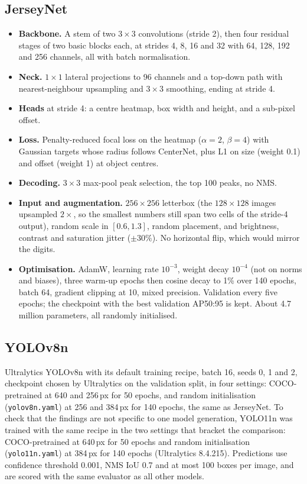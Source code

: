 \documentclass[10pt,a4paper]{article}
\begin{document}
\subsection{JerseyNet}
\begin{itemize}
  \item \textbf{Backbone.} A stem of two $3\times3$ convolutions (stride 2), then four residual
    stages of two basic blocks each, at strides 4, 8, 16 and 32 with 64, 128, 192 and 256
    channels, all with batch normalisation.
  \item \textbf{Neck.} $1\times1$ lateral projections to 96 channels and a top-down path with
    nearest-neighbour upsampling and $3\times3$ smoothing, ending at stride 4.
  \item \textbf{Heads} at stride 4: a centre heatmap, box width and height, and a sub-pixel offset.
  \item \textbf{Loss.} Penalty-reduced focal loss on the heatmap ($\alpha=2$, $\beta=4$) with
    Gaussian targets whose radius follows CenterNet, plus L1 on size (weight 0.1) and offset
    (weight 1) at object centres.
  \item \textbf{Decoding.} $3\times3$ max-pool peak selection, the top 100 peaks, no NMS.
  \item \textbf{Input and augmentation.} $256\times256$ letterbox (the $128\times128$ images
    upsampled $2\times$, so the smallest numbers still span two cells of the stride-4 output),
    random scale in $[0.6, 1.3]$, random placement, and brightness, contrast and saturation
    jitter ($\pm30\%$). No horizontal flip, which would mirror the digits.
  \item \textbf{Optimisation.} AdamW, learning rate $10^{-3}$, weight decay $10^{-4}$ (not on
    norms and biases), three warm-up epochs then cosine decay to 1\% over 140 epochs, batch 64,
    gradient clipping at 10, mixed precision. Validation every five epochs; the checkpoint with
    the best validation AP50:95 is kept. About 4.7 million parameters, all randomly initialised.
\end{itemize}

\subsection{YOLOv8n}
Ultralytics YOLOv8n with its default training recipe, batch 16, seeds 0, 1 and 2, checkpoint
chosen by Ultralytics on the validation split, in four settings: COCO-pretrained at 640 and
256\,px for 50 epochs, and random initialisation (\texttt{yolov8n.yaml}) at 256 and 384\,px for
140 epochs, the same as JerseyNet. To check that the findings are not specific to one model
generation, YOLO11n \citep{jocher2024yolo11} was trained with the same recipe in the two settings
that bracket the comparison: COCO-pretrained at 640\,px for 50 epochs and random initialisation
(\texttt{yolo11n.yaml}) at 384\,px for 140 epochs (Ultralytics 8.4.215). Predictions use
confidence threshold 0.001, NMS IoU 0.7 and at most 100 boxes per image, and are scored with the
same evaluator as all other models.
\end{document}
